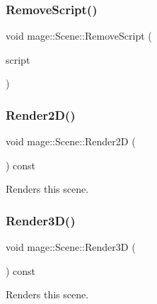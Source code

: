 \hypertarget{classmage_1_1_scene_a82705ba56543dea410439760b1667bc5}{}\label{classmage_1_1_scene_a82705ba56543dea410439760b1667bc5} 
\subsubsection{\texorpdfstring{Remove\+Script()}{RemoveScript()}}
{\footnotesize\ttfamily void mage\+::\+Scene\+::\+Remove\+Script (\begin{DoxyParamCaption}\item[{\hyperlink{namespacemage_a1e01ae66713838a7a67d30e44c67703e}{Shared\+Ptr}$<$ \hyperlink{classmage_1_1_behavior_script}{Behavior\+Script} $>$}]{script }\end{DoxyParamCaption})}

\hypertarget{classmage_1_1_scene_a53487349d68f0ffcc91b243d0cfb86a3}{}\label{classmage_1_1_scene_a53487349d68f0ffcc91b243d0cfb86a3} 
\subsubsection{\texorpdfstring{Render2\+D()}{Render2D()}}
{\footnotesize\ttfamily void mage\+::\+Scene\+::\+Render2D (\begin{DoxyParamCaption}{ }\end{DoxyParamCaption}) const}

Renders this scene. \hypertarget{classmage_1_1_scene_a51d2d441067d30cf3a444d6a80811f93}{}\label{classmage_1_1_scene_a51d2d441067d30cf3a444d6a80811f93} 
\subsubsection{\texorpdfstring{Render3\+D()}{Render3D()}}
{\footnotesize\ttfamily void mage\+::\+Scene\+::\+Render3D (\begin{DoxyParamCaption}{ }\end{DoxyParamCaption}) const}

Renders this scene. \hypertarget{classmage_1_1_scene_a57718151e0102306b3abb22da45ae27a}{}\label{classmage_1_1_scene_a57718151e0102306b3abb22da45ae27a} 
